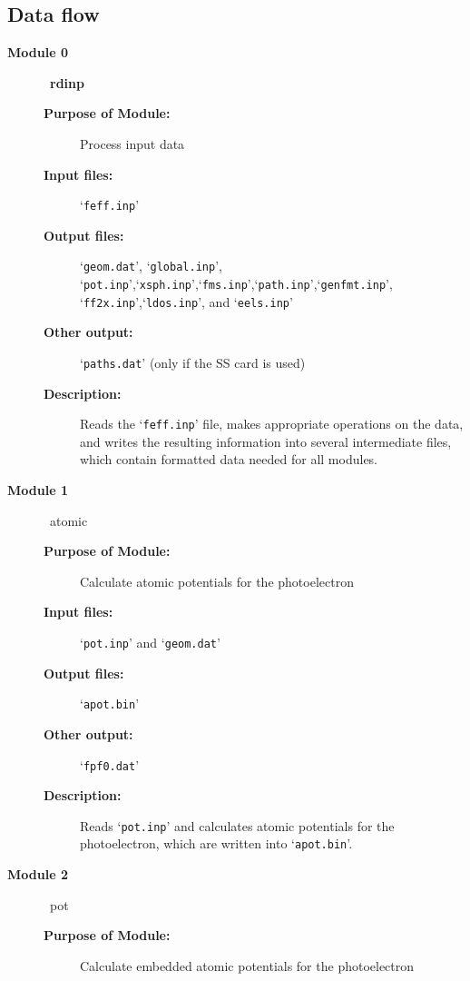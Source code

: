 \documentclass[11pt,oneside]{report} %
\newcommand{\file}[1]{`\texttt{#1}'}
\newcommand{\module}[1]{\textrm{\bf{#1}}}
\begin{document}
\begin{latexonly}
\newpage

\section{Data flow}
\label{sec:File-structure-code}

\begin{description}
\item[\large\textbf{Module 0}]\dotfill\  {\large\module{rdinp}}
  \begin{description}
  \item[\textbf{Purpose of Module:}] Process input data
  \item[\textbf{Input files:}] \file{feff.inp}
  \item[\textbf{Output files:}] \file{geom.dat}, \file{global.inp},
       \file{pot.inp},\file{xsph.inp},\file{fms.inp},\file{path.inp},\file{genfmt.inp},
       \file{ff2x.inp},\file{ldos.inp}, and \file{eels.inp}
  \item[\textbf{Other output:}] \file{paths.dat} (only if the SS card is used)
  \item[\textbf{Description:}] Reads the \file{feff.inp} file, makes
    appropriate operations on the data, and writes the resulting
    information into several intermediate files, which
    contain formatted data needed for all modules.
  \end{description}
\item [\large\textbf{Module 1}]\dotfill\  {\large\textrm{atomic}}
  \begin{description}
  \item[\textbf{Purpose of Module:}] Calculate atomic
    potentials for the photoelectron
  \item[\textbf{Input files:}] \file{pot.inp} and \file{geom.dat}
  \item[\textbf{Output files:}] \file{apot.bin}
  \item[\textbf{Other output:}] \file{fpf0.dat}
  \item[\textbf{Description:}] Reads \file{pot.inp} and calculates atomic potentials
    for the photoelectron, which are written into \file{apot.bin}.
  \end{description}
\item [\large\textbf{Module 2}]\dotfill\  {\large\textrm{pot}}
  \begin{description}
  \item[\textbf{Purpose of Module:}] Calculate embedded atomic
    potentials for the photoelectron

\end{description}
\end{description}
\end{latexonly}
\end{document}
